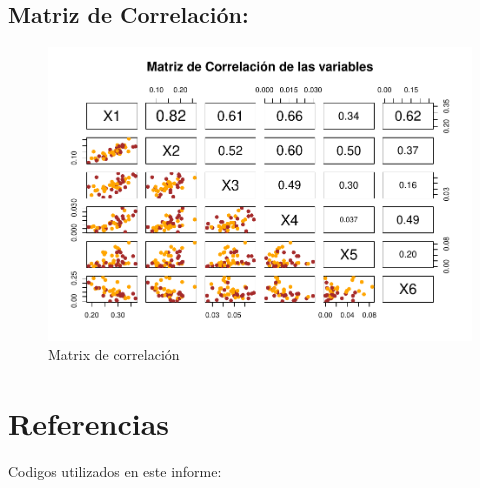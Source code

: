 \documentclass{staprojteamusb}
\begin{document}
 \hypertarget{matriz-de-correlaciuxf3n}{%
 \subsection{Matriz de Correlación:}\label{matriz-de-correlaciuxf3n}}

 \begin{figure}
 \centering
 \includegraphics{C03322-InformeFinal-Cordero-Gavazut-Riera_files/figure-latex/unnamed-chunk-13-1.pdf}
 \caption{\label{fig:unnamed-chunk-13}Matrix de correlación}
 \end{figure}

 \newpage

 \hypertarget{referencias}{%
 \section{Referencias}\label{referencias}}

 Codigos utilizados en este informe:
\end{document}
